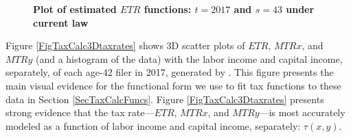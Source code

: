   \begin{figure}[htbp]\captionsetup{width=4.0in}
    \centering
    \caption{\label{FigTaxCalcETRtotinc}\textbf{Plot of estimated $ETR$ functions: $t=2017$ and $s=43$ under current law}}
  \end{figure}

  Figure \ref{FigTaxCalc3Dtaxrates} shows 3D scatter plots of $ETR$, $MTRx$, and $MTRy$ (and a histogram of the data) with the labor income and capital income, separately, of each age-42 filer in 2017, generated by \taxcalc. This figure presents the main visual evidence for the functional form we use to fit tax functions to these data in Section \ref{SecTaxCalcFuncs}. Figure \ref{FigTaxCalc3Dtaxrates} presents strong evidence that the tax rate---$ETR$, $MTRx$, and $MTRy$---is most accurately modeled as a function of labor income and capital income, separately: $\tau(x,y)$.

